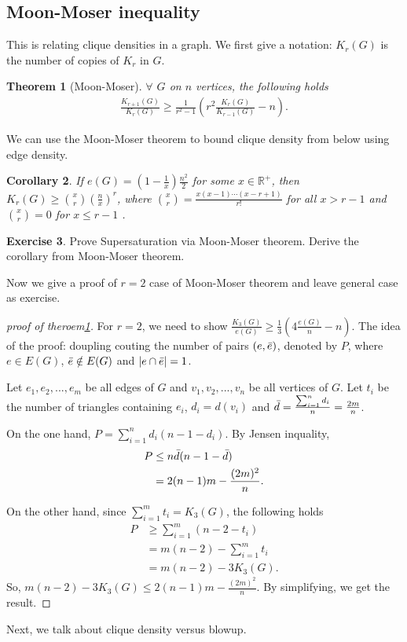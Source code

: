 \documentclass{article}
\newtheorem{theorem}{Theorem}[section]
\newtheorem{corollary}[theorem]{Corollary}
\theoremstyle{definition}
\newtheorem{exercise}[theorem]{Exercise}
\begin{document}
\subsection{Moon-Moser inequality}
This is relating clique densities in a graph.
We first give a notation: $K_r(G)$ is the number of copies of $K_r$ in $G$.
\begin{theorem}[Moon-Moser]\label{thm5.13}
    $\forall$ $G$ on $n$ vertices, the following holds
    \begin{align*}
        \frac{K_{r+1}(G)}{K_{r}(G)}\geq \frac{1}{r^2-1}(r^2\frac{K_{r}(G)}{K_{r-1}(G)}-n).
    \end{align*}
\end{theorem}
We can use the Moon-Moser theorem to bound clique density from below using edge density.
\begin{corollary}
    If $e(G)=(1-\frac{1}{x})\frac{n^2}{2}$ for some $x\in \mathbb{R}^+$, then $K_r(G)\geq\binom{x}{r}(\frac{n}{x})^r$, where $\binom{x}{r}=\frac{x(x-1)\cdots(x-r+1)}{r!}$ for all $x>r-1$ and $\binom{x}{r}=0$ for $x\leq r-1$ .
\end{corollary}
\begin{exercise}
     Prove Supersaturation via Moon-Moser theorem. Derive the corollary from Moon-Moser theorem.
\end{exercise}
Now we give a proof of $r=2$ case of Moon-Moser theorem and leave general case as exercise.
\begin{proof}[proof of theroem\ref{thm5.13}]
    For $r=2$, we need to show $\frac{K_{3}(G)}{e(G)}\geq \frac{1}{3}(4\frac{e(G)}{n}-n).$
    The idea of the proof: doupling couting the number of pairs $(e,\Bar{e})$, denoted by $P$, where $e\in E(G)$, $\Bar{e}\notin E(G)$ and $|e\cap \Bar{e}|=1$.
    
    Let $e_1,e_2,...,e_m$ be all edges of $G$ and $v_1,v_2,...,v_n$ be all vertices of $G$. Let $t_i$ be the number of triangles containing $e_i$, $d_i=d(v_i)$ and $\Bar{d}=\frac{\sum_{i=1}^nd_i}{n}=\frac{2m}{n}$.
    
    On the one hand, $P=\sum_{i=1}^nd_i(n-1-d_i)$. By Jensen inquality, 
    \begin{align*}
        P&\leq n\Bar{d}(n-1-\Bar{d})\\
        &=2(n-1)m-\frac{(2m)^2}{n}.
    \end{align*}

    On the other hand, since $\sum_{i=1}^mt_i=K_3(G)$, the following holds
    \begin{align*}
        P&\geq\sum_{i=1}^m(n-2-t_i)\\
        &=m(n-2)-\sum_{i=1}^mt_i\\
        &=m(n-2)-3K_3(G).
    \end{align*}
    So, $m(n-2)-3K_3(G)\leq 2(n-1)m-\frac{(2m)^2}{n}$. By simplifying, we get the result.
\end{proof}
Next, we talk about clique density versus blowup.
\end{document}
